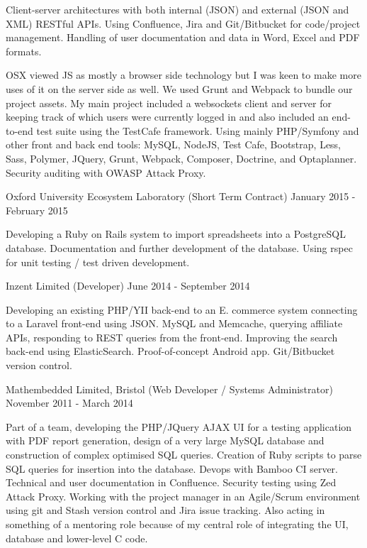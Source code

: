 Client-server architectures with both
internal (JSON) and external (JSON and XML) RESTful APIs.
Using Confluence, Jira and Git/Bitbucket for code/project management.
Handling of user documentation and data in Word, Excel and PDF formats.


\ifnum{}
    OSX viewed JS as mostly a browser side technology
    but I was keen to make more uses of it on the server side as well.
    We used Grunt and Webpack to bundle our project assets.
    My main project included a websockets client and server
    for keeping track of which users were currently logged in
    and also included an end-to-end test suite
    using the TestCafe framework.
\else
    Using mainly PHP/Symfony and other front and back end tools:
    MySQL, NodeJS, Test Cafe, Bootstrap, Less, Sass,
    Polymer, JQuery, Grunt, Webpack, Composer,
    Doctrine, and Optaplanner.
    Security auditing with OWASP Attack Proxy.
\fi

\jobHeading
    {Oxford University Ecosystem Laboratory (Short Term Contract)}
    {January 2015 - February 2015}

Developing a Ruby on Rails
system to import spreadsheets into a PostgreSQL database.
Documentation and further development of the database.
Using rspec for unit testing / test driven development.

\jobHeading
    {Inzent Limited (Developer)}
    {June 2014 - September 2014}

Developing an existing PHP/YII back-end to an
E. commerce system connecting to a Laravel front-end using JSON.
MySQL and Memcache, querying affiliate APIs,
responding to REST queries from the front-end.
Improving the search back-end using ElasticSearch.
Proof-of-concept Android app.
Git/Bitbucket version control.

\jobHeading
    {Mathembedded Limited, Bristol (Web Developer / Systems Administrator)}
    {November 2011 - March 2014}

Part of a team, developing the PHP/JQuery AJAX UI
for a testing application with PDF report generation,
design of a very large MySQL database
and construction of complex optimised SQL queries.
Creation of Ruby scripts
to parse SQL queries for insertion into the database.
Devops with Bamboo CI server.
Technical and user documentation in Confluence.
Security testing using Zed Attack Proxy.
Working with the project manager in an Agile/Scrum environment
using git and Stash version control and Jira issue tracking.
Also acting in something of a mentoring role
because of my central role of integrating the UI,
database and lower-level C code.

